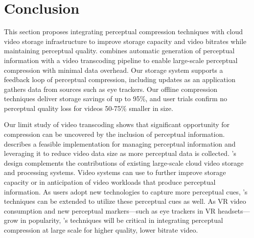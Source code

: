 \section{Conclusion}
This section proposes integrating perceptual compression techniques with cloud video storage infrastructure to improve storage capacity and video bitrates while maintaining perceptual quality.
\name combines automatic generation of perceptual information with a video transcoding pipeline to enable large-scale perceptual compression with minimal data overhead.
Our storage system supports a feedback loop of perceptual compression, including updates as an application gathers data from sources such as eye trackers.
Our offline compression techniques deliver storage savings of up to 95\%, and user trials confirm no perceptual quality loss for \name videos 50-75\% smaller in size.

Our limit study of video transcoding shows that significant opportunity for compression can be uncovered by the inclusion of perceptual information.
\name describes a feasible implementation for managing perceptual information and leveraging it to reduce video data size as more perceptual data is collected.
\name's design complements the contributions of existing large-scale cloud video storage and processing systems.
Video systems can use \name to further improve storage capacity or in anticipation of video workloads that produce perceptual information.
As users adopt new technologies to capture more perceptual cues, \name's techniques can be extended to utilize these perceptual cues as well.
As VR video consumption and new perceptual markers---such as eye trackers in VR headsets---grow in popularity, \name's techniques will be critical in integrating perceptual compression at large scale for higher quality, lower bitrate video. %

